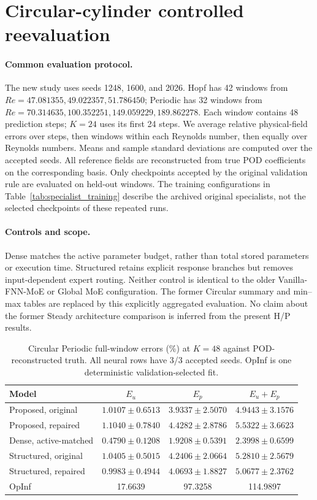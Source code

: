 \section{Circular-cylinder controlled reevaluation}
\label{app:circular}

\paragraph{Common evaluation protocol.}
The new study uses seeds 1248, 1600, and 2026. Hopf has 42 windows
from $Re=47.081355,49.022357,51.786450$; Periodic has 32 windows from
$Re=70.314635,100.352251,149.059229,189.862278$. Each window contains
48 prediction steps; $K=24$ uses its first 24 steps. We average relative
physical-field errors over steps, then windows within each Reynolds
number, then equally over Reynolds numbers. Means and sample standard
deviations are computed over the accepted seeds. All reference fields
are reconstructed from true POD coefficients on the corresponding basis.
Only checkpoints accepted by the original validation rule are evaluated
on held-out windows. The training configurations in
Table~\ref{tab:specialist_training} describe the archived original
specialists, not the selected checkpoints of these repeated runs.

\paragraph{Controls and scope.}
Dense matches the active parameter budget, rather than total stored
parameters or execution time. Structured retains explicit response
branches but removes input-dependent expert routing. Neither control
is identical to the older Vanilla-FNN-MoE or Global MoE configuration.
The former Circular summary and min--max tables are replaced by this
explicitly aggregated evaluation. No claim about the former Steady
architecture comparison is inferred from the present H/P results.

\begin{table}[H]
\centering
\caption{Circular Periodic full-window errors (\%) at $K=48$ against
POD-reconstructed truth. All neural rows have 3/3 accepted seeds.
OpInf is one deterministic validation-selected fit.}
\label{tab:circular_full}
\small
\setlength{\tabcolsep}{3pt}
\begin{tabular}{@{}lccc@{}}
\toprule
Model & $E_u$ & $E_p$ & $E_u+E_p$\\
\midrule
Proposed, original & $1.0107\pm0.6513$ & $3.9337\pm2.5070$ & $4.9443\pm3.1576$\\
Proposed, repaired & $1.1040\pm0.7840$ & $4.4282\pm2.8786$ & $5.5322\pm3.6623$\\
Dense, active-matched & $\mathbf{0.4790\pm0.1208}$ & $\mathbf{1.9208\pm0.5391}$ & $\mathbf{2.3998\pm0.6599}$\\
Structured, original & $1.0405\pm0.5015$ & $4.2406\pm2.0664$ & $5.2810\pm2.5679$\\
Structured, repaired & $0.9983\pm0.4944$ & $4.0693\pm1.8827$ & $5.0677\pm2.3762$\\
OpInf & 17.6639 & 97.3258 & 114.9897\\
\bottomrule
\end{tabular}
\end{table}

